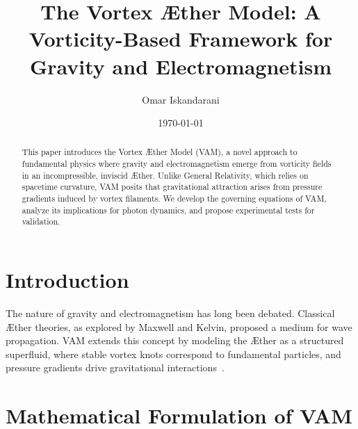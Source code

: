 \documentclass[a4paper,10pt]{article}
\title{The Vortex \AE ther Model: A Vorticity-Based Framework for Gravity and Electromagnetism}
\author{Omar Iskandarani}
\date{\today}
\begin{document}
    \maketitle

    \maketitle


    \begin{abstract}
        This paper introduces the Vortex \AE ther Model (VAM), a novel approach to fundamental physics where gravity and electromagnetism emerge from vorticity fields in an incompressible, inviscid \AE ther.
        Unlike General Relativity, which relies on spacetime curvature, VAM posits that gravitational attraction arises from pressure gradients induced by vortex filaments.
        We develop the governing equations of VAM, analyze its implications for photon dynamics, and propose experimental tests for validation.
    \end{abstract}

    \section{Introduction}\label{sec:introduction}
    The nature of gravity and electromagnetism has long been debated. Classical \AE ther theories, as explored by Maxwell and Kelvin, proposed a medium for wave propagation.
    VAM extends this concept by modeling the \AE ther as a structured superfluid, where stable vortex knots correspond to fundamental particles, and pressure gradients drive gravitational interactions~\cite{maxwell1861, clausius1865, helmholtz1858, kelvin1867, verlinde2010, scalo2017}.

    \section{Mathematical Formulation of VAM}\label{sec:mathematical-formulation-of-vam}
\end{document}
